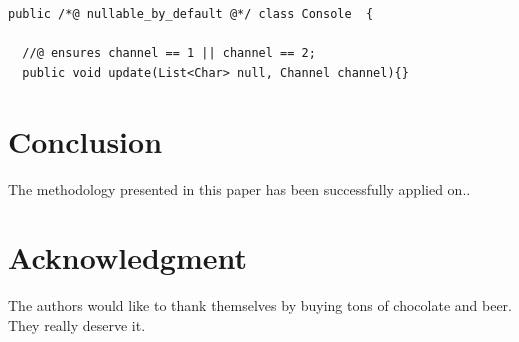 \documentclass[conference]{IEEEtran}
\begin{document}
\begin{lstlisting}
public /*@ nullable_by_default @*/ class Console  {

  //@ ensures channel == 1 || channel == 2;
  public void update(List<Char> null, Channel channel){}
\end{lstlisting}
\section{Conclusion}
\label{sec:conclusion}

The methodology presented in this paper has been successfully applied on.. 


\section*{Acknowledgment}
\label{sec:acknowledgment}

The authors would like to thank themselves by buying tons of chocolate
and beer. They really deserve it. 



%
%
%
%





\end{document}
